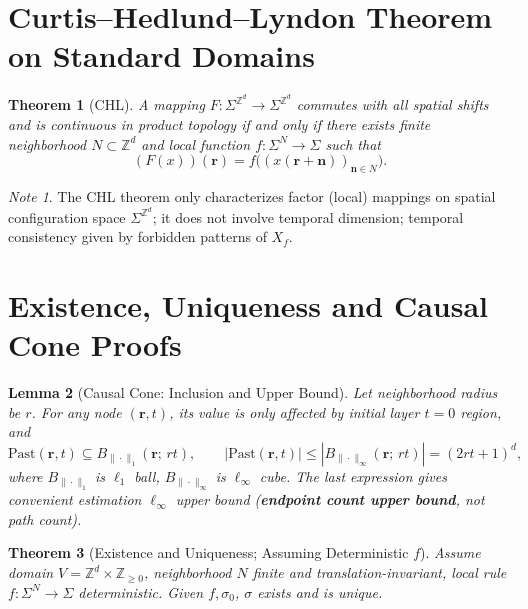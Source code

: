 \documentclass[11pt]{article}
\newtheorem{theorem}{Theorem}[section]
\newtheorem{lemma}[theorem]{Lemma}
\theoremstyle{definition}
\theoremstyle{remark}
\newtheorem*{note}{Note}
\begin{document}
\section{Curtis--Hedlund--Lyndon Theorem on Standard Domains}\label{sec:curtis}

\begin{theorem}[CHL]\label{thm:chl}
A mapping \( F:\Sigma^{\mathbb Z^d}\to \Sigma^{\mathbb Z^d} \) commutes with all spatial shifts and is continuous in product topology if and only if there exists finite neighborhood \( N\subset \mathbb Z^d \) and local function \( f:\Sigma^N\to \Sigma \) such that
\[
(F(x))(\mathbf r)=f\big((x(\mathbf r+\mathbf n))_{\mathbf n\in N}\big).
\]
\end{theorem}

\begin{note}
The CHL theorem only characterizes factor (local) mappings on spatial configuration space \( \Sigma^{\mathbb{Z}^d} \); it does not involve temporal dimension; temporal consistency given by forbidden patterns of \( X_f \).
\end{note}

\section{Existence, Uniqueness and Causal Cone Proofs}\label{sec:existence}

\begin{lemma}[Causal Cone: Inclusion and Upper Bound]\label{lem:cone}
Let neighborhood radius be \( r \). For any node \( (\mathbf r,t) \), its value is only affected by initial layer \( t=0 \) region, and
\[
\mathrm{Past}(\mathbf r,t)\subseteq B_{\|\cdot\|_1}(\mathbf r;\, r t),\qquad
|\mathrm{Past}(\mathbf r,t)|\le |B_{\|\cdot\|_\infty}(\mathbf r;\, r t)|
=(2 r t+1)^d,
\]
where \( B_{\|\cdot\|_1} \) is \( \ell_1 \) ball, \( B_{\|\cdot\|_\infty} \) is \( \ell_\infty \) cube. The last expression gives convenient estimation \( \ell_\infty \) upper bound (\textbf{endpoint count upper bound}, not path count).
\end{lemma}

\begin{theorem}[Existence and Uniqueness; Assuming Deterministic \( f \)]\label{thm:existence}
Assume domain \( V=\mathbb Z^d\times\mathbb Z_{\ge0} \), neighborhood \( N \) finite and translation-invariant, local rule \( f:\Sigma^{N}\to\Sigma \) deterministic. Given \( f, \sigma_0 \), \( \sigma \) exists and is unique.
\end{theorem}
\end{document}

